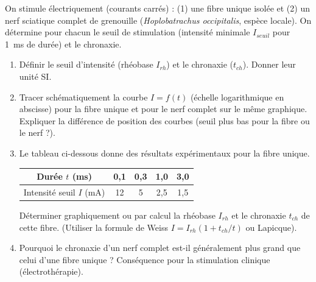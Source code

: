 \documentclass[11pt]{article}
\begin{document}
\begin{exercice}
On stimule électriquement (courants carrés) : (1) une fibre unique isolée et (2) un nerf sciatique complet de grenouille (\textit{Hoplobatrachus occipitalis}, espèce locale). On détermine pour chacun le seuil de stimulation (intensité minimale $I_{seuil}$ pour \SI{1}{\milli\second} de durée) et le chronaxie.
\begin{enumerate}
    \item Définir le seuil d'intensité (rhéobase $I_{rh}$) et le chronaxie ($t_{ch}$). Donner leur unité SI.
    \item Tracer schématiquement la courbe $I = f(t)$ (échelle logarithmique en abscisse) pour la fibre unique et pour le nerf complet sur le même graphique. Expliquer la différence de position des courbes (seuil plus bas pour la fibre ou le nerf ?).
    \item Le tableau ci-dessous donne des résultats expérimentaux pour la fibre unique.
    \begin{center}
    \begin{tabular}{|c|c|c|c|c|}
    \hline
    Durée $t$ (\si{\milli\second}) & 0,1 & 0,3 & 1,0 & 3,0 \\ \hline
    Intensité seuil $I$ (\si{\milli\ampere}) & 12 & 5 & 2,5 & 1,5 \\ \hline
    \end{tabular}
    \end{center}
    Déterminer graphiquement ou par calcul la rhéobase $I_{rh}$ et le chronaxie $t_{ch}$ de cette fibre. (Utiliser la formule de Weiss $I = I_{rh}(1 + t_{ch}/t)$ ou Lapicque).
    \item Pourquoi le chronaxie d'un nerf complet est-il généralement plus grand que celui d'une fibre unique ? Conséquence pour la stimulation clinique (électrothérapie).
\end{enumerate}
\end{exercice}
\end{document}
